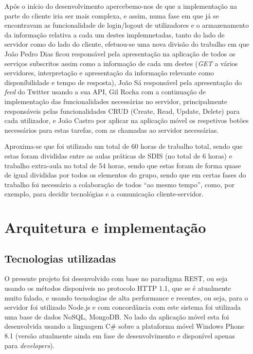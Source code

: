 \documentclass[12pt]{article}
\begin{document}
Após o início do desenvolvimento apercebemo-nos de que a implementação na parte do cliente iria ser mais complexa, e assim, numa fase em que já se encontravam as funcionalidade de login/logout de utilizadores e o armazenamento da informação relativa a cada um destes implemnetadas, tanto do lado de servidor como do lado do cliente, efetuou-se uma nova divisão do trabalho em que João Pedro Dias ficou responsável pela apresentação na aplicação de todos os serviços subscritos assim como a informação de cada um destes (\textit{GET} a vários servidores, interpretação e apresentação da informação relevante como disponíbilidade e tempo de resposta), João Sá responsável pela apresentação do \textit{feed} do Twitter usando a sua API, Gil Rocha com a continuação de implementação das funcionalidades necessárias no servidor, principalmente responsáveis pelas funcionalidades CRUD (Create, Read, Update, Delete) para cada utilizador, e João Castro por aplicar na aplicação móvel os respetivos botões necessários para estas tarefas, com as chamadas ao servidor necessárias.

Aproxima-se que foi utilizado um total de 60 horas de trabalho total, sendo que estas foram divididas entre as aulas práticas de SDIS (no total de 6 horas) e trabalho extra-aula no total de 54 horas, sendo que estas foram de forma quase de igual divididas por todos os elementos do grupo, sendo que em certas fases do trabalho foi necessário a colaboração de todos ``ao mesmo tempo'', como, por exemplo, para decidir tecnológias e a comunicação cliente-servidor. 

\section{Arquitetura e implementação}
\subsection{Tecnologias utilizadas}
	O presente projeto foi desenvolvido com base no paradigma REST, ou seja usando os métodos disponíveis no protocolo HTTP 1.1, que se é atualmente muito falado, e usando tecnologias de alta performance e recentes, ou seja, para o servidor foi utilizado Node.js e com concordância com este sistema foi utilizada uma base de dados NoSQL, MongoDB. No lado da aplicação móvel esta foi desenvolvida usando a linguagem C\# sobre a plataforma móvel Windows Phone 8.1 (versão atualmente ainda em fase de desenvolvimento e disponível apenas para \textit{developers}).
	
\end{document}
